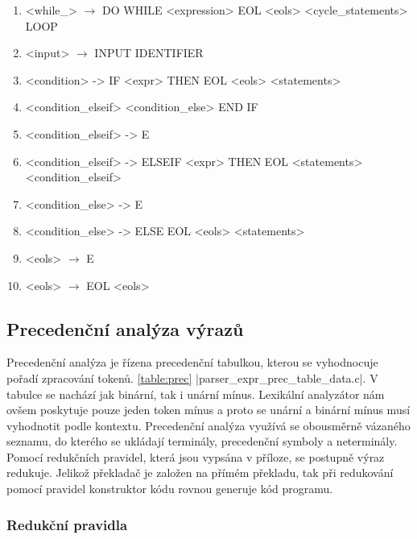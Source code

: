 \begin{enumerate}
\item <while\_> $\rightarrow$ DO WHILE <expression> EOL <eols> <cycle\_statements> LOOP

\item <input> $\rightarrow$ INPUT IDENTIFIER

\item <condition> -> IF <expr> THEN EOL <eols> <statements>
\item <condition\_elseif> <condition\_else> END IF
\item <condition\_elseif> -> E
\item <condition\_elseif> -> ELSEIF <expr> THEN EOL <statements> <condition\_elseif>

\item <condition\_else> -> E
\item <condition\_else> -> ELSE EOL <eols> <statements>

\item <eols> $\rightarrow$ E
\item <eols> $\rightarrow$ EOL <eols>

\end{enumerate}
\newpage
\subsection{Precedenční analýza výrazů}
Precedenční analýza je řízena precedenční tabulkou, kterou se vyhodnocuje pořadí zpracování tokenů. \ref{table:prec}
\ic|parser_expr_prec_table_data.c|. V tabulce se nachází jak binární, tak i unární mínus. 
Lexikální analyzátor nám ovšem poskytuje pouze jeden token mínus a proto se unární a binární mínus 
musí vyhodnotit podle kontextu. Precedenční analýza využívá se obousměrně vázaného seznamu, do kterého se ukládají terminály, 
precedenční symboly a neterminály. Pomocí redukčních pravidel, která jsou vypsána v příloze, se postupně výraz redukuje. 
Jelikož překladač je založen na přímém překladu, tak při redukování pomocí pravidel konstruktor kódu rovnou generuje kód programu.

\subsubsection{Redukční pravidla}

